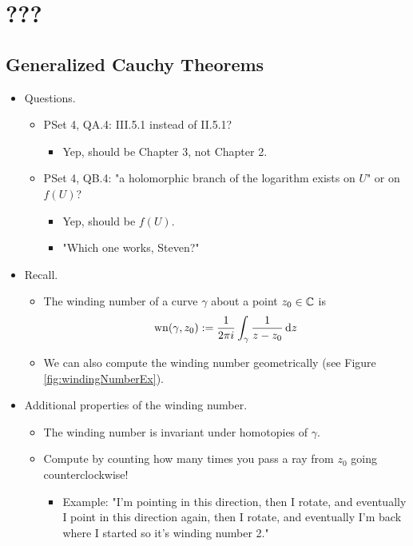 \documentclass[../notes.tex]{subfiles}
\begin{document}
\chapter{???}
\section{Generalized Cauchy Theorems}
\begin{itemize}
    \item {}Questions.
    \begin{itemize}
        \item PSet 4, QA.4: III.5.1 instead of II.5.1?
        \begin{itemize}
            \item Yep, should be Chapter 3, not Chapter 2.
        \end{itemize}
        \item PSet 4, QB.4: "a holomorphic branch of the logarithm exists on $U$" or on $f(U)$?
        \begin{itemize}
            \item Yep, should be $f(U)$.
            \item "Which one works, Steven?"
        \end{itemize}
    \end{itemize}
    \item Recall.
    \begin{itemize}
        \item The winding number of a curve $\gamma$ about a point $z_0\in\mathbb{C}$ is
        \begin{equation*}
            \operatorname{wn}(\gamma,z_0) := \frac{1}{2\pi i}\int_\gamma\frac{1}{z-z_0}\dd{z}
        \end{equation*}
        \item We can also compute the winding number geometrically (see Figure \ref{fig:windingNumberEx}).
    \end{itemize}
    \item Additional properties of the winding number.
    \begin{itemize}
        \item The winding number is invariant under homotopies of $\gamma$.
        \item Compute by counting how many times you pass a ray from $z_0$ going counterclockwise!
        \begin{itemize}
            \item Example: "I'm pointing in this direction, then I rotate, and eventually I point in this direction again, then I rotate, and eventually I'm back where I started so it's winding number 2."

\end{itemize}
\end{itemize}
\end{itemize}
\end{document}
